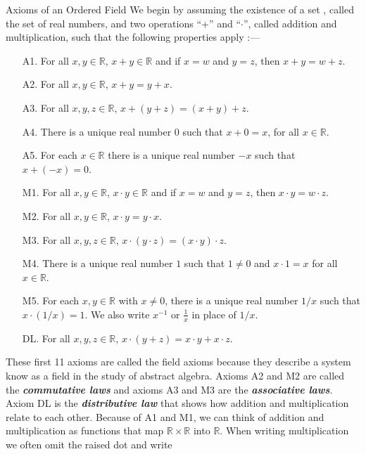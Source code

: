 \documentclass[12pt]{article}
\newcommand\Real{\mathbb{R}}
\begin{document}
\begin{definition}{Axioms of an Ordered Field}
  We begin by assuming the existence of a set \Real, called the set of real
  numbers, and two operations ``+'' and ``$\cdot$'', called addition and
  multiplication, such that the following properties apply :---
  \begin{itemize}
  \item [A1. ] For all $x,y \in \Real$, $x + y \in \Real$ and if $x = w$ and $y
    = z$, then $x + y = w + z$.
  \item [A2. ] For all $x,y \in \Real$, $x + y = y + x$.
  \item [A3. ] For all $x,y,z \in \Real$, $x + (y + z) = (x + y) + z$.
  \item [A4. ] There is a unique real number $0$ such that $x + 0 = x$, for all
    $x \in \Real$.
  \item [A5. ] For each $x \in \Real$ there is a unique real number $-x$ such
    that $x + (-x) = 0$.
  \item [M1. ] For all $x,y \in \Real$, $x \cdot y \in \Real$ and if $x = w$ and
    $y = z$, then $x \cdot y = w \cdot z$.
  \item [M2. ] For all $x,y \in \Real$, $x \cdot y = y \cdot x$.
  \item [M3. ] For all $x,y,z \in \Real$, $x \cdot (y \cdot z) =(x \cdot y)
    \cdot z$.
  \item [M4. ] There is a unique real number $1$ such that $1 \ne 0$ and $x
    \cdot 1 = x$ for all $x \in \Real$.
  \item [M5. ] For each $x,y \in \Real$ with $x \ne 0$, there is a unique real
    number $1/x$ such that $x \cdot (1/x) = 1$. We also write $x^{-1}$ or
    $\frac{1}{x}$ in place of $1/x$.
  \item [DL. ] For all $x,y,z \in \Real$, $x \cdot (y + z) = x \cdot y + x \cdot
    z$.
  \end{itemize}
  \begin{remark}
    These first 11 axioms are called the field axioms because they describe a
    system know as a field in the study of abstract algebra. Axioms A2 and M2
    are called the \textit{\textbf{commutative laws}} and axioms A3 and M3 are
    the \textit{\textbf{associative laws}}. Axiom DL is the
    \textit{\textbf{distributive law}} that shows how addition and
    multiplication relate to each other. Because of A1 and M1, we can think of
    addition and multiplication as functions that map $\Real \times \Real$ into
    $\Real$. When writing multiplication we often omit the raised dot and write

\end{remark}
\end{definition}
\end{document}
